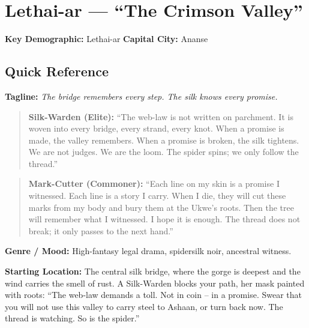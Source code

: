 \section{Lethai-ar --- ``The Crimson Valley''}
\label{chap:lethai-ar}

\textbf{Key Demographic: } Lethai-ar
\textbf{Capital City: } Ananse

\subsection*{Quick Reference}
\textbf{Tagline:} \textit{The bridge remembers every step. The silk knows every promise.}

\begin{quote}
  \textbf{Silk-Warden (Elite):}  
  ``The web-law is not written on parchment. It is woven into every bridge, every strand, every knot. When a promise is made, the valley remembers. When a promise is broken, the silk tightens. We are not judges. We are the loom. The spider spins; we only follow the thread.''
\end{quote}

\begin{quote}
  \textbf{Mark-Cutter (Commoner):}  
  ``Each line on my skin is a promise I witnessed. Each line is a story I carry. When I die, they will cut these marks from my body and bury them at the Ukwe's roots. Then the tree will remember what I witnessed. I hope it is enough. The thread does not break; it only passes to the next hand.''
\end{quote}

\textbf{Genre / Mood:} High-fantasy legal drama, spidersilk noir, ancestral witness.

\textbf{Starting Location:} The central silk bridge, where the gorge is deepest and the wind carries the smell of rust. A Silk-Warden blocks your path, her mask painted with roots: ``The web-law demands a toll. Not in coin -- in a promise. Swear that you will not use this valley to carry steel to Ashaan, or turn back now. The thread is watching. So is the spider.''

